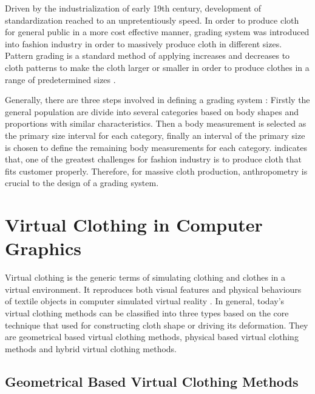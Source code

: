 Driven by the industrialization of early 19th century, development of standardization reached to an unpretentiously speed. In order to produce cloth for general public in a more cost effective manner, grading system was introduced into fashion industry in order to massively produce cloth in different sizes. Pattern grading is a standard method of applying increases and decreases to cloth patterns to make the cloth larger or smaller in order to produce clothes in a range of predetermined sizes .
 
Generally, there are three steps involved in defining a grading system  : Firstly the general population are divide into several categories based on body shapes and proportions with similar characteristics. Then a body measurement is selected as the primary size interval for each category, finally an interval of the primary size is chosen to define the remaining body measurements for each category.  indicates that, one of the greatest challenges for fashion industry is to produce cloth that fits customer properly. Therefore, for massive cloth production, anthropometry is crucial to the design of a grading system. 
 
\section{Virtual Clothing in Computer Graphics}

Virtual clothing is the generic terms of simulating clothing and clothes in a virtual environment. It reproduces both visual features and physical behaviours of textile objects in computer simulated virtual reality . In general, today's virtual clothing methods can be classified into three types based on the core technique that used for constructing cloth shape or driving its deformation. They are geometrical based virtual clothing methods, physical based virtual clothing methods and hybrid virtual clothing methods. 


\subsection{Geometrical Based Virtual Clothing Methods}

